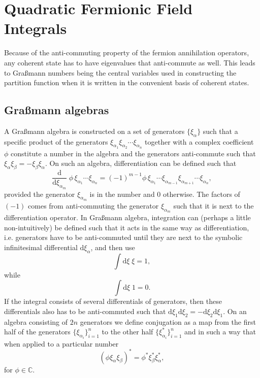 \section{Quadratic Fermionic Field Integrals}

Because of the anti-commuting property of the fermion annihilation operators, any coherent state has to have eigenvalues that anti-commute as well. 
This leads to Gra\ss mann numbers being the central variables used in constructing the partition function when it 
is written in the convenient basis of coherent states.

\subsection{Gra\ss mann algebras}
A Gra\ss mann algebra is constructed on a set of generators $\{\xi_\alpha\}$ such that a specific product
of the generators $\xi_{\alpha_1}\xi_{\alpha_2}\cdots\xi_{\alpha_n}$ together with a complex coefficient $\phi$ constitute a
number in the algebra and the generators anti-commute such that $\xi_\alpha\xi_\beta = -\xi_\beta\xi_\alpha$. On such
an algebra, differentiation can be defined such that
\begin{equation}
    \label{eq:Field:Ferm:Grass:diff}
    \frac{\mathrm{d}}{\mathrm{d}\xi_{\alpha_m}}\;\phi\,\xi_{\alpha_1}\cdots\xi_{\alpha_n} = (-1)^{m-1}\phi\,\xi_{\alpha_1}\cdots\xi_{\alpha_{m-1}}\xi_{\alpha_{m+1}}\cdots\xi_{\alpha_n},
\end{equation}
provided the generator $\xi_{\alpha_m}$ is in the number and $0$ otherwise. The factors of $(-1)$ comes from anti-commuting
the generator $\xi_{\alpha_m}$ such that it is next to the differentiation operator. In Gra\ss mann algebra, integration
can (perhaps a little non-intuitively) be defined such that it acts in the same way as differentiation, i.e. generators
have to be anti-commuted until they are next to the symbolic infinitesimal differential $\mathrm{d}\xi_{\alpha}$, and then use
\begin{equation}
    \label{eq:Field:Ferm:Grass:int}
    \int\!\mathrm{d}\xi\;\xi = 1,
\end{equation}
while
\begin{equation}
    \label{eq:Field:Ferm:Grass:int2}
    \int\!\mathrm{d}\xi\;1 = 0.
\end{equation}
If the integral consists of several differentials of generators, then these differentials also has to be anti-commuted such that $\mathrm{d}\xi_1\mathrm{d}\xi_2 = -\mathrm{d}\xi_2\mathrm{d}\xi_1$.
On an algebra consisting of $2n$ generators we define conjugation as a map from the first half of the generators $\{\xi_{\alpha_i}\}_{i=1}^n$
to the other half $\{\xi_{\alpha_i}^\ast\}_{i=1}^n$ and in such a way that when applied to a particular number
\begin{equation}
    \label{eq:Field:Ferm:Grass:conj}
    (\phi\xi_\alpha\xi_\beta)^\ast = \phi^\ast\xi_\beta^\ast\xi_\alpha^\ast,
\end{equation}
for $\phi\in\mathbb{C}$.

